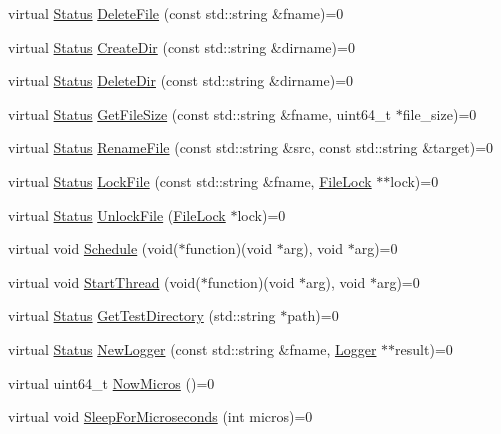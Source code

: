 \begin{DoxyCompactItemize}
\item 
virtual \mbox{\hyperlink{classleveldb_1_1_status}{Status}} \mbox{\hyperlink{classleveldb_1_1_env_ac956b984466d5f09309664177687f9af}{Delete\+File}} (const std\+::string \&fname)=0
\item 
virtual \mbox{\hyperlink{classleveldb_1_1_status}{Status}} \mbox{\hyperlink{classleveldb_1_1_env_ae6b7c8122df5a8020b2a3439ac39646e}{Create\+Dir}} (const std\+::string \&dirname)=0
\item 
virtual \mbox{\hyperlink{classleveldb_1_1_status}{Status}} \mbox{\hyperlink{classleveldb_1_1_env_a4e1a1c4495541e426b146cba56c59627}{Delete\+Dir}} (const std\+::string \&dirname)=0
\item 
virtual \mbox{\hyperlink{classleveldb_1_1_status}{Status}} \mbox{\hyperlink{classleveldb_1_1_env_aacb66541dcb3bd586e6cc5a87489690c}{Get\+File\+Size}} (const std\+::string \&fname, uint64\+\_\+t $\ast$file\+\_\+size)=0
\item 
virtual \mbox{\hyperlink{classleveldb_1_1_status}{Status}} \mbox{\hyperlink{classleveldb_1_1_env_abd743b3d4751ada1ab307427827ed5b0}{Rename\+File}} (const std\+::string \&src, const std\+::string \&target)=0
\item 
virtual \mbox{\hyperlink{classleveldb_1_1_status}{Status}} \mbox{\hyperlink{classleveldb_1_1_env_a9b7266f0444f832e428328ff19b7b54c}{Lock\+File}} (const std\+::string \&fname, \mbox{\hyperlink{classleveldb_1_1_file_lock}{File\+Lock}} $\ast$$\ast$lock)=0
\item 
virtual \mbox{\hyperlink{classleveldb_1_1_status}{Status}} \mbox{\hyperlink{classleveldb_1_1_env_a194a2ee3c21bc0b204ad0e5bc3b81d4b}{Unlock\+File}} (\mbox{\hyperlink{classleveldb_1_1_file_lock}{File\+Lock}} $\ast$lock)=0
\item 
virtual void \mbox{\hyperlink{classleveldb_1_1_env_a6b5fc50322d8404f5b13fad0e03d8724}{Schedule}} (void($\ast$function)(void $\ast$arg), void $\ast$arg)=0
\item 
virtual void \mbox{\hyperlink{classleveldb_1_1_env_a25eafd1622a2cf2a415ee8b2325bc808}{Start\+Thread}} (void($\ast$function)(void $\ast$arg), void $\ast$arg)=0
\item 
virtual \mbox{\hyperlink{classleveldb_1_1_status}{Status}} \mbox{\hyperlink{classleveldb_1_1_env_ab57a55be37d4d57bf3c0ff83ee689f95}{Get\+Test\+Directory}} (std\+::string $\ast$path)=0
\item 
virtual \mbox{\hyperlink{classleveldb_1_1_status}{Status}} \mbox{\hyperlink{classleveldb_1_1_env_a53a4c41d294fe619f13ec5b697ffc933}{New\+Logger}} (const std\+::string \&fname, \mbox{\hyperlink{classleveldb_1_1_logger}{Logger}} $\ast$$\ast$result)=0
\item 
virtual uint64\+\_\+t \mbox{\hyperlink{classleveldb_1_1_env_a988062bcd558ac02c62522ac2c8aa39f}{Now\+Micros}} ()=0
\item 
virtual void \mbox{\hyperlink{classleveldb_1_1_env_a43ad838cfb08db3d9e2197800cd33312}{Sleep\+For\+Microseconds}} (int micros)=0
\end{DoxyCompactItemize}
